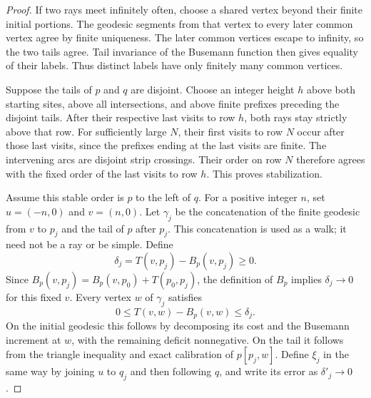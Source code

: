 \begin{proof}
If two rays meet infinitely often, choose a shared vertex beyond their
finite initial portions.  The geodesic segments from that vertex to every
later common vertex agree by finite uniqueness.  The later common vertices
escape to infinity, so the two tails agree.  Tail invariance of the
Busemann function then gives equality of their labels.  Thus distinct
labels have only finitely many common vertices.

Suppose the tails of $p$ and $q$ are disjoint.  Choose an integer height
$h$ above both starting sites, above all intersections, and above finite
prefixes preceding the disjoint tails.  After their respective last visits
to row $h$, both rays stay strictly above that row.  For sufficiently large
$N$, their first visits to row $N$ occur after those last visits, since the
prefixes ending at the last visits are finite.  The intervening arcs are
disjoint strip crossings.  Their order on row $N$ therefore agrees with
the fixed order of the last visits to row $h$.  This proves stabilization.

Assume this stable order is $p$ to the left of $q$.  For a positive integer
$n$, set $u=(-n,0)$ and $v=(n,0)$.  Let $\gamma_j$ be the concatenation of
the finite geodesic from $v$ to $p_j$ and the tail of $p$ after $p_j$.
This concatenation is used as a walk; it need not be a ray or be simple.
Define
\[
 \delta_j=T(v,p_j)-B_p(v,p_j)\geq0.
\]
Since
$B_p(v,p_j)=B_p(v,p_0)+T(p_0,p_j)$, the definition of $B_p$ implies
$\delta_j\to0$ for this fixed $v$.  Every vertex $w$ of $\gamma_j$ satisfies
\begin{equation}\label{eq:near-calibration}
 0\leq T(v,w)-B_p(v,w)\leq\delta_j.
\end{equation}
On the initial geodesic this follows by decomposing its cost and the
Busemann increment at $w$, with the remaining deficit nonnegative.
On the tail it follows from the triangle inequality and exact calibration
of $p[p_j,w]$.  Define $\xi_j$ in the same way by joining $u$ to $q_j$
and then following $q$, and write its error as $\delta'_j\to0$.


\end{proof}
